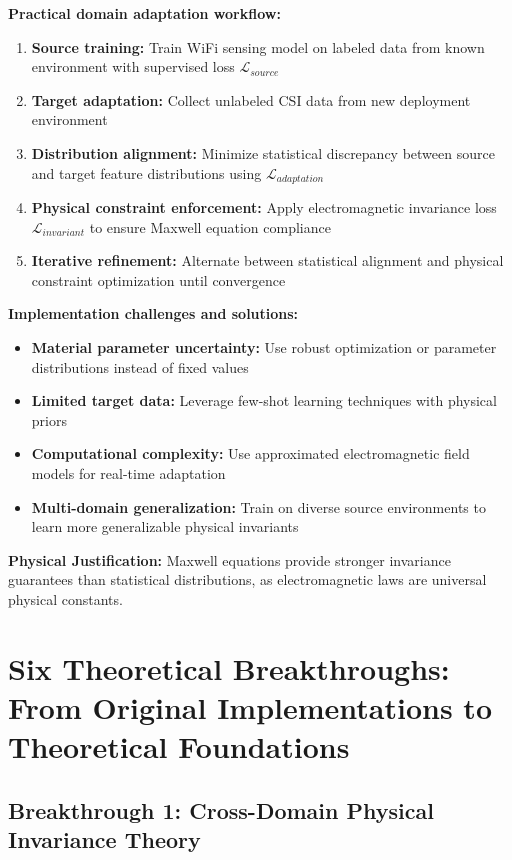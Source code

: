 \documentclass[12pt,a4paper]{article}
\begin{document}
\textbf{Practical domain adaptation workflow:}
\begin{enumerate}
\item \textbf{Source training:} Train WiFi sensing model on labeled data from known environment with supervised loss $\mathcal{L}_{source}$
\item \textbf{Target adaptation:} Collect unlabeled CSI data from new deployment environment
\item \textbf{Distribution alignment:} Minimize statistical discrepancy between source and target feature distributions using $\mathcal{L}_{adaptation}$
\item \textbf{Physical constraint enforcement:} Apply electromagnetic invariance loss $\mathcal{L}_{invariant}$ to ensure Maxwell equation compliance
\item \textbf{Iterative refinement:} Alternate between statistical alignment and physical constraint optimization until convergence
\end{enumerate}

\textbf{Implementation challenges and solutions:}
\begin{itemize}
\item \textbf{Material parameter uncertainty:} Use robust optimization or parameter distributions instead of fixed values
\item \textbf{Limited target data:} Leverage few-shot learning techniques with physical priors
\item \textbf{Computational complexity:} Use approximated electromagnetic field models for real-time adaptation
\item \textbf{Multi-domain generalization:} Train on diverse source environments to learn more generalizable physical invariants
\end{itemize}

\textbf{Physical Justification:} Maxwell equations provide stronger invariance guarantees than statistical distributions, as electromagnetic laws are universal physical constants.

\section{Six Theoretical Breakthroughs: From Original Implementations to Theoretical Foundations}

\subsection{Breakthrough 1: Cross-Domain Physical Invariance Theory}
\end{document}

